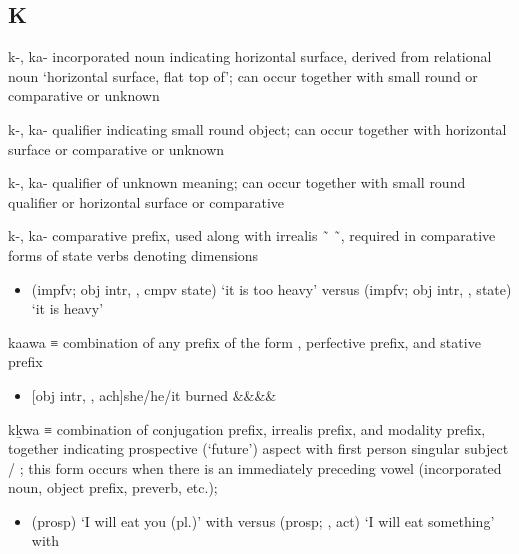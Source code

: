 \documentclass[12pt,letterpaper,oneside,article]{memoir}
\begin{document}
\subsection{K}\label{sec:alphalist-k}
\begin{morphdesc}[resume*=alphalist]
\item[k-, ka-]
	incorporated noun indicating horizontal surface,
	derived from relational noun  ‘horizontal surface, flat top of’;
	can occur together with  small round
		or  comparative
		or  unknown	

\item[k-, ka-]
	qualifier indicating small round object;
	can occur together with  horizontal surface
		or  comparative
		or  unknown

\item[k-, ka-]
	qualifier of unknown meaning;
	can occur together with  small round qualifier 
		or  horizontal surface
		or  comparative

\item[k-, ka-]
	comparative prefix, used along with irrealis  \~\  \~\ ,
	required in comparative forms of state verbs denoting dimensions
	\begin{itemize}
	\item	{} (impfv; obj intr, ,  cmpv state) ‘it is too heavy’\newline
		versus  (impfv; obj intr, ,  state) ‘it is heavy’
	\end{itemize}

\item[kaawa]
	≡ 
	combination of any prefix of the form ,
		 perfective prefix,
		and  stative prefix
	\begin{itemize}
	\item	{}[obj intr, , ach]{she/he/it burned}
				{&&&&\·}
	\end{itemize}


\item[kḵwa]
	≡ 
	combination of  conjugation prefix,
		 irrealis prefix,
		and  modality prefix,
			together indicating prospective (‘future’) aspect
		with first person singular subject  / ;
	this form occurs when there is an
		immediately preceding vowel (incorporated noun, object prefix, preverb, etc.);
	\begin{itemize}
	\item	{} (prosp) ‘I will eat you (pl.)’
			with \newline
		versus  (prosp; ,  act) ‘I will eat something’
			with 
	\end{itemize}


\end{morphdesc}
\end{document}
